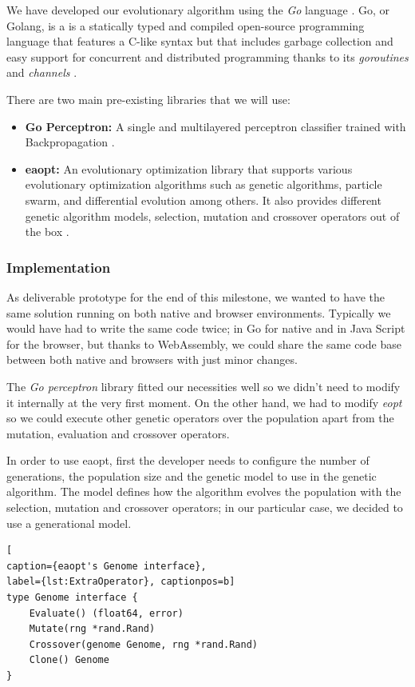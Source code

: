 We have developed our evolutionary algorithm using the \textit{Go} language \cite{go}. Go, or Golang, is a is a statically typed and compiled open-source programming language that features a C-like syntax but that includes garbage collection and easy support for concurrent and distributed programming thanks to its \textit{goroutines} \cite{channels} and \textit{channels} \cite{channels}.

There are two main pre-existing libraries that we will use:

\begin{itemize}
	\item \textbf{Go Perceptron:} A single and multilayered perceptron classifier trained with Backpropagation \cite{go-perceptron-go}.
	\item \textbf{eaopt:} An evolutionary optimization library that supports various evolutionary optimization algorithms such as genetic algorithms, particle swarm, and differential evolution among others. It also provides different genetic algorithm models, selection, mutation and crossover operators out of the box \cite{eaopt}.
\end{itemize}

\subsubsection*{Implementation}
As deliverable prototype for the end of this milestone, we wanted to have the same solution running on both native and browser environments. Typically we would have had to write the same code twice; in Go for native and in Java Script for the browser, but thanks to WebAssembly, we could share the same code base between both native and browsers with just minor changes.

The \textit{Go perceptron} library fitted our necessities well so we didn't need to modify it internally at the very first moment. On the other hand, we had to modify \textit{eopt} so we could execute other genetic operators over the population apart from the mutation, evaluation and crossover operators.

In order to use eaopt, first the developer needs to configure the number of generations, the population size and the genetic model to use in the genetic algorithm. The model defines how the algorithm evolves the population with the selection, mutation and crossover operators; in our particular case, we decided to use a generational model.

\begin{lstlisting}[
caption={eaopt's Genome interface},
label={lst:ExtraOperator}, captionpos=b]
type Genome interface {
	Evaluate() (float64, error)
	Mutate(rng *rand.Rand)
	Crossover(genome Genome, rng *rand.Rand)
	Clone() Genome
}
\end{lstlisting}

